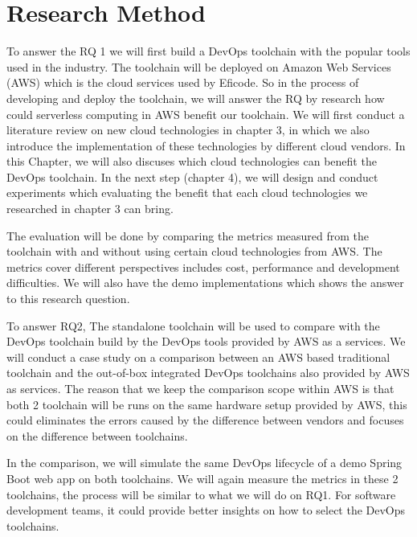 \section{Research Method}
To answer the RQ 1 we will first build a DevOps toolchain with the popular tools used in the industry. The toolchain will be deployed on Amazon Web Services (AWS) which is the cloud services used by Eficode.  
So in the process of developing and deploy the toolchain, we will answer the RQ by research how could serverless computing in AWS benefit our toolchain. We will first conduct a literature review on new cloud technologies in chapter 3, in which we also introduce the implementation of these technologies by different cloud vendors. In this Chapter, we will also discuses which cloud technologies can benefit the DevOps toolchain. In the next step (chapter 4), we will design and conduct experiments which evaluating the benefit that each cloud technologies we researched in chapter 3 can bring. 
\par
The evaluation will be done by comparing the metrics measured from the toolchain with and without using certain cloud technologies from AWS. The metrics cover different perspectives includes cost, performance and development difficulties. We will also have the demo implementations which shows the answer to this research question.
\par
To answer RQ2, The standalone toolchain will be used to compare with the DevOps toolchain build by the DevOps tools provided by AWS as a services. We will conduct a case study on a comparison between an AWS based traditional toolchain and the out-of-box integrated DevOps toolchains also provided by AWS as services. The reason that we keep the comparison scope within AWS is that both 2 toolchain will be runs on the same hardware setup provided by AWS, this could eliminates the errors caused by the difference between vendors and focuses on the difference between toolchains.
\par
In the comparison, we will simulate the same DevOps lifecycle of a demo Spring Boot web app on both toolchains. We will again measure the metrics in these 2 toolchains, the process will be similar to what we will do on RQ1.
For software development teams, it could provide better insights on how to select the DevOps toolchains.
